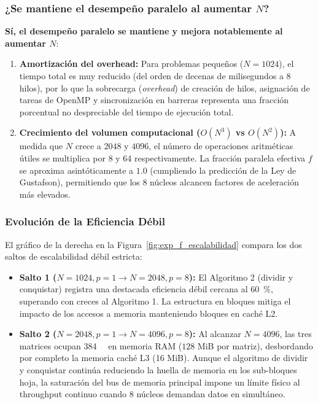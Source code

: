 \subsubsection{¿Se mantiene el desempeño paralelo al aumentar $N$?}
\textbf{Sí, el desempeño paralelo se mantiene y mejora notablemente al aumentar $N$}:
\begin{enumerate}
    \item \textbf{Amortización del overhead:} Para problemas pequeños ($N=1024$), el tiempo total es muy reducido (del orden de decenas de milisegundos a 8 hilos), por lo que la sobrecarga (\emph{overhead}) de creación de hilos, asignación de tareas de OpenMP y sincronización en barreras representa una fracción porcentual no despreciable del tiempo de ejecución total.
    \item \textbf{Crecimiento del volumen computacional ($O(N^3)$ vs $O(N^2)$):} A medida que $N$ crece a $2048$ y $4096$, el número de operaciones aritméticas útiles se multiplica por 8 y 64 respectivamente. La fracción paralela efectiva $f$ se aproxima asintóticamente a $1.0$ (cumpliendo la predicción de la Ley de Gustafson), permitiendo que los 8 núcleos alcancen factores de aceleración más elevados.
\end{enumerate}

\subsubsection{Evolución de la Eficiencia Débil}
El gráfico de la derecha en la Figura~\ref{fig:exp_f_escalabilidad} compara los dos saltos de escalabilidad débil estricta:
\begin{itemize}
    \item \textbf{Salto 1 ($N=1024, p=1 \to N=2048, p=8$):} El Algoritmo 2 (dividir y conquistar) registra una destacada eficiencia débil cercana al \SI{60}{\percent}, superando con creces al Algoritmo 1. La estructura en bloques mitiga el impacto de los accesos a memoria manteniendo bloques en caché L2.
    \item \textbf{Salto 2 ($N=2048, p=1 \to N=4096, p=8$):} Al alcanzar $N=4096$, las tres matrices ocupan \SI{384}{\mebi\byte} en memoria RAM ($128$ MiB por matriz), desbordando por completo la memoria caché L3 (16 MiB). Aunque el algoritmo de dividir y conquistar continúa reduciendo la huella de memoria en los sub-bloques hoja, la saturación del bus de memoria principal impone un límite físico al throughput continuo cuando 8 núcleos demandan datos en simultáneo.
\end{itemize}

